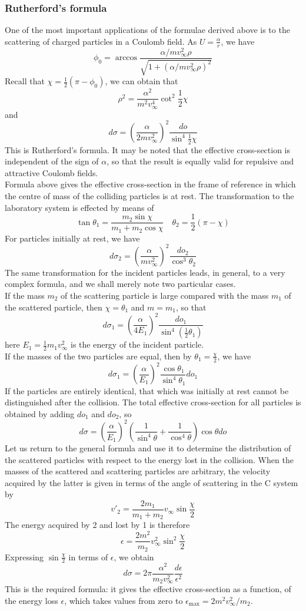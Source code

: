 \subsubsection{Rutherford's formula}
One of the most important applications of the formulae derived above is to the scattering of charged particles in a Coulomb field. As $U = \frac{\alpha}{r}$, we have
\[\phi_0 = \arccos \frac{\alpha/mv^2_{\infty}\rho}{\sqrt{1+(\alpha/mv^2_{\infty}\rho)^2}}\]
Recall that $\chi = \frac{1}{2}(\pi-\phi_0)$, we can obtain that
\[\rho^2 = \frac{\alpha^2}{m^2v_{\infty}^4} \cot^2 \frac{1}{2}\chi\]
and
\[d\sigma = \left( \frac{\alpha}{2mv_{\infty}^2} \right)^2 \frac{do}{\sin^4 \frac{1}{2}\chi}\]
This is Rutherford's formula. It may be noted that the effective cross-section is independent of the sign of $\alpha$, so that the result is equally valid for repulsive
and attractive Coulomb fields.\\
Formula above gives the effective cross-section in the frame of reference in which the centre of mass of the colliding particles is at rest. The transformation to the laboratory system is effected by means of
\[\tan\theta_1 = \frac{m_2\sin\chi}{m_1 + m_2 \cos\chi} \quad \theta_2 = \frac{1}{2}(\pi - \chi)\]
For particles initially at rest, we have
\[d\sigma_2 = \left ( \frac{\alpha}{mv^2_{\infty}} \right )^2 \frac{do_2}{\cos^3 \theta_2}\]
The same transformation for the incident particles leads, in general, to a very complex formula, and we shall merely note two particular cases.\\
If the mass $m_2$ of the scattering particle is large compared with the mass $m_1$ of the scattered particle, then $\chi = \theta_1$ and $m = m_1$, so that
\[d\sigma_1 = \left ( \frac{\alpha}{4E_1}\right )^2 \frac{do_1}{\sin^4 (\frac{1}{2}\theta_1)}\]
here $E_1 = \frac{1}{2}m_1v^2_{\infty}$ is the energy of the incident particle.\\
If the masses of the two particles are equal, then by $\theta_1 = \frac{\chi}{2}$, we have
\[d\sigma_1 =  \left ( \frac{\alpha}{E_1}\right )^2 \frac{\cos\theta_1}{\sin^4\theta_1} do_1\]
If the particles are entirely identical, that which was initially at rest cannot be distinguished after the collision. The total effective cross-section for all
particles is obtained by adding $do_1$ and $do_2$, so
\[d\sigma = \left ( \frac{\alpha}{E_1}\right )^2 \left ( \frac{1}{\sin^4\theta} + \frac{1}{\cos^4\theta} \right )\cos\theta do\]
Let us return to the general formula and use it to determine the distribution of the scattered particles with respect to the energy lost in the collision. 
When the masses of the scattered and scattering particles are arbitrary, the velocity acquired by the latter is given in terms of the angle of scattering in the C system by
\[v'_2 = \frac{2m_1}{m_1+m_2} v_{\infty} \sin \frac{\chi}{2}\]
The energy acquired by 2 and lost by 1 is therefore
\[\epsilon = \frac{2m^2}{m_2} v_{\infty}^2 \sin^2 \frac{\chi}{2} \]
Expressing $\sin \frac{\chi}{2}$ in terms of $\epsilon$, we obtain
\[d\sigma = 2\pi \frac{\alpha^2}{m_2 v^2_{\infty}} \frac{d\epsilon}{\epsilon^2}\]
This is the required formula: it gives the effective cross-section as a function, of the energy loss $\epsilon$, which takes values from zero to $\epsilon_{\mathrm{max}} = 2m^2 v_{\infty}^2 /m_2$.

